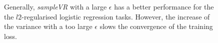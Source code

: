 \documentclass[letterpaper]{article}
\begin{document}
\begin{figure}[t]
\centering
{}
\caption{Generally, \emph{sampleVR} with a large $\epsilon$ has a better performance for the the $l2$-regularised logistic regression tasks. However,  the increase of the variance with a too large $\epsilon$ slows the convergence of the training loss.}
\label{figure_logistic_regression_rho}
\end{figure}
\end{document}
